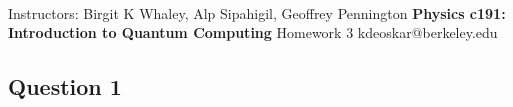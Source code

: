\documentclass[11pt]{article}
\begin{document}
\thispagestyle{empty}
\bigskip \
\vspace{0.1cm}

\begin{center}
{\fontsize{14}{14} \selectfont Instructors: Birgit K Whaley, Alp Sipahigil, Geoffrey Pennington}
\vskip 16pt
{\fontsize{30}{30} \selectfont \bf \sffamily Physics c191: Introduction to Quantum Computing}
\vskip 24pt
{\fontsize{14}{14} \selectfont \rmfamily Homework 3} 
\vskip 6pt
{\fontsize{14}{14} \selectfont \ttfamily kdeoskar@berkeley.edu} 
\vskip 24pt
\end{center}




\subsection*{Question 1}
\end{document}
